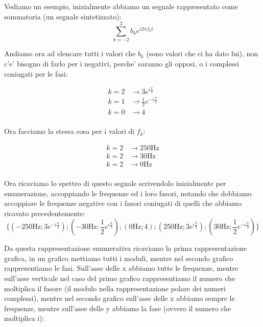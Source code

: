 Vediamo un esempio, inizialmente abbiamo un segnale rappresentato come sommatoria (un segnale sintetizzato):
\begin{equation}
    \sum_{k = -2}^{2} b_k e^{i 2 \pi f_k t}
\end{equation}

Andiamo ora ad elencare tutti i valori che $b_k$ (sono valori che ci ha dato lui), non c'e' bisogno di farlo per i negativi, perche' saranno gli opposi, o i complessi coniugati per le fasi:

\begin{equation}\begin{split}
   k=2 &\rightarrow 3 e^{i \frac{\pi}{2}} \\
   k=1 &\rightarrow \frac{1}{2} e^{-i \frac{\pi}{3}} \\
   k=0 &\rightarrow 4 \\
\end{split}\end{equation}

Ora facciamo la stessa cosa per i valori di $f_k$:

\begin{equation}\begin{split}
   k=2 &\rightarrow 250 \mbox{Hz} \\
   k=2 &\rightarrow 30 \mbox{Hz} \\
   k=2 &\rightarrow 0 \mbox{Hz} \\
\end{split}\end{equation}

Ora ricaviamo lo spettro di questo segnale scrivendolo inizialmente per enumerazione, accoppiando le frequenze ed i loro fasori, notando che dobbiamo accoppiare le frequenze negative con i fasori coniugati di quelli che abbiamo ricavato precedentemente:
\begin{equation}
    \{ (-250 \mbox{Hz}; 3e^{-i\frac{\pi}{2}}); (-30 \mbox{Hz}; \frac{1}{2}e^{i\frac{\pi}{3}}); (0 \mbox{Hz}; 4); (250 \mbox{Hz}; 3e^{i\frac{\pi}{2}}); (30 \mbox{Hz}; \frac{1}{2}e^{-i\frac{\pi}{3}}) \}
\end{equation}

Da questa rappresentazione enumerativa ricaviamo la prima rappresentazione grafica, in un grafico mettiamo tutti i moduli, mentre nel secondo grafico rappresentiamo le fasi.
Sull'asse delle x abbiamo tutte le frequenze, mentre sull'asse verticale nel caso del primo grafico rappresentiamo il numero che moltiplica il fasore (il modulo nella rappresentazione polare dei numeri complessi), mentre nel secondo grafico sull'asse delle x abbiamo sempre le frequenze, mentre sull'asse delle y abbiamo la fase (ovvero il numero che moltiplica i):

